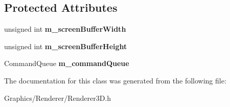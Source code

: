 \subsection*{Protected Attributes}
\begin{DoxyCompactItemize}
\item 
\mbox{\label{classce_1_1graphics_1_1_renderer3_d_ae0794abc076ff68ed7c8eb9fd2bbd278}} 
unsigned int {\bfseries m\+\_\+screen\+Buffer\+Width}
\item 
\mbox{\label{classce_1_1graphics_1_1_renderer3_d_a03b1b45f98919b5468fce308f19fac57}} 
unsigned int {\bfseries m\+\_\+screen\+Buffer\+Height}
\item 
\mbox{\label{classce_1_1graphics_1_1_renderer3_d_a495b3dd349daf3e7f7b7b0cc0de8d950}} 
Command\+Queue {\bfseries m\+\_\+command\+Queue}
\end{DoxyCompactItemize}


The documentation for this class was generated from the following file\+:\begin{DoxyCompactItemize}
\item 
Graphics/\+Renderer/Renderer3\+D.\+h\end{DoxyCompactItemize}
